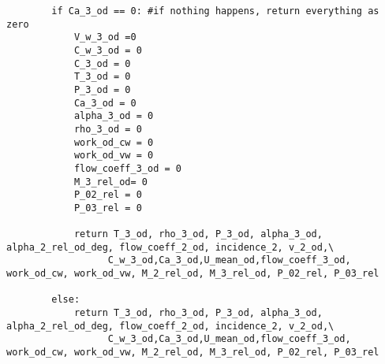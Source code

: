 \begin{verbatim}
        if Ca_3_od == 0: #if nothing happens, return everything as zero
            V_w_3_od =0
            C_w_3_od = 0
            C_3_od = 0
            T_3_od = 0
            P_3_od = 0
            Ca_3_od = 0
            alpha_3_od = 0
            rho_3_od = 0
            work_od_cw = 0
            work_od_vw = 0
            flow_coeff_3_od = 0
            M_3_rel_od= 0
            P_02_rel = 0
            P_03_rel = 0

            return T_3_od, rho_3_od, P_3_od, alpha_3_od, alpha_2_rel_od_deg, flow_coeff_2_od, incidence_2, v_2_od,\
                  C_w_3_od,Ca_3_od,U_mean_od,flow_coeff_3_od, work_od_cw, work_od_vw, M_2_rel_od, M_3_rel_od, P_02_rel, P_03_rel
                
        else:
            return T_3_od, rho_3_od, P_3_od, alpha_3_od, alpha_2_rel_od_deg, flow_coeff_2_od, incidence_2, v_2_od,\
                  C_w_3_od,Ca_3_od,U_mean_od,flow_coeff_3_od, work_od_cw, work_od_vw, M_2_rel_od, M_3_rel_od, P_02_rel, P_03_rel




\end{verbatim}
